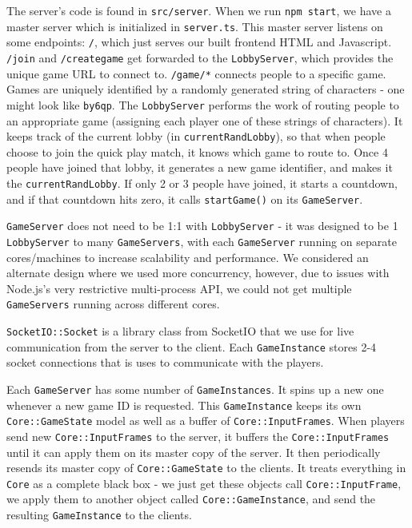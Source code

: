 \documentclass[12pt]{report}
\begin{document}
The server's code is found in \texttt{src/server}. When we run \texttt{npm start}, we have a master server which is initialized in \texttt{server.ts}. This master server listens on some endpoints: \texttt{/}, which just serves our built frontend HTML and Javascript. \texttt{/join} and \texttt{/creategame} get forwarded to the \texttt{LobbyServer}, which provides the unique game URL to connect to. \texttt{/game/*} connects people to a specific game.
Games are uniquely identified by a randomly generated string of characters - one might look like \texttt{by6qp}. The \texttt{LobbyServer} performs the work of routing people to an appropriate game (assigning each player one of these strings of characters). It keeps track of the current lobby (in \texttt{currentRandLobby}), so that when people choose to join the quick play match, it knows which game to route to. Once 4 people have joined that lobby, it generates a new game identifier, and makes it the \texttt{currentRandLobby}. If only 2 or 3 people have joined, it starts a countdown, and if that countdown hits zero, it calls \texttt{startGame()} on its \texttt{GameServer}.


\texttt{GameServer} does not need to be 1:1 with \texttt{LobbyServer} - it was designed to be 1 \texttt{LobbyServer} to many \texttt{GameServers}, with each \texttt{GameServer} running on separate cores/machines to increase scalability and performance. We considered an alternate design where we used more concurrency, however, due to issues with Node.js's very restrictive multi-process API, we could not get multiple \texttt{GameServers} running across different cores.


\texttt{SocketIO::Socket} is a library class from SocketIO that we use for live communication from the server to the client. Each \texttt{GameInstance} stores 2-4 socket connections that is uses to communicate with the players.


Each \texttt{GameServer} has some number of \texttt{GameInstances}. It spins up a new one whenever a new game ID is requested. This \texttt{GameInstance} keeps its own  \texttt{Core::GameState} model as well as a buffer of \texttt{Core::InputFrames}. When players send new \texttt{Core::InputFrames} to the server, it buffers the \texttt{Core::InputFrames} until it can apply them on its master copy of the server. It then periodically resends its master copy of \texttt{Core::GameState} to the clients. It treats everything in \texttt{Core} as a complete black box - we just get these objects call \texttt{Core::InputFrame}, we apply them to another object called \texttt{Core::GameInstance}, and send the resulting \texttt{GameInstance} to the clients.
\end{document}
